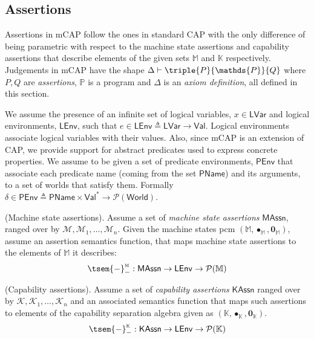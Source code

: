 \subsection{Assertions}

Assertions in mCAP follow the ones in standard CAP with the only difference of being parametric with respect to the machine state assertions and capability assertions that describe elements of the given sets $\mathbb{M}$ and $\mathbb{K}$ respectively. Judgements in mCAP have the shape $\Delta \vdash \triple{P}{\mathds{P}}{Q}$ where $P, Q$ are \textit{assertions}, $\mathds{P}$ is a program and $\Delta$ is an \textit{axiom definition}, all defined in this section.

We assume the presence of an infinite set of logical variables, $x \in \mathsf{LVar}$ and logical environments, $\mathsf{LEnv}$, such that $e \in \mathsf{LEnv} \triangleq \mathsf{LVar} \rightarrow \mathsf{Val}$. Logical environments associate logical variables with their values. Also, since mCAP is an extension of CAP, we provide support for abstract predicates used to express concrete properties. We assume to be given a set of predicate environments, $\mathsf{PEnv}$ that associate each predicate name (coming from the set $\mathsf{PName}$) and its arguments, to a set of worlds that satisfy them. Formally $\delta \in \mathsf{PEnv} \triangleq \mathsf{PName} \times \mathsf{Val}^* \rightarrow \mathcal{P}(\mathsf{World})$.

\begin{param}
	(Machine state assertions).
	Assume a set of \emph{machine state assertions} $\mathsf{MAssn}$, ranged over by $\mathcal{M}, \mathcal{M}_1, \ldots, \mathcal{M}_n$. Given the machine states pcm $(\mathbb{M}, \bullet_\mathbb{M}, \mathbf{0}_\mathbb{M})$, assume an assertion semantics function, that maps machine state assertions to the elements of $\mathbb{M}$ it describes:
	\[
		\tsem{-}_-^\textsc{m} : \mathsf{MAssn} \rightarrow \mathsf{LEnv} \rightarrow \mathcal{P}(\mathbb{M})
	\]
\end{param}

\begin{param}
	(Capability assertions).
	Assume a set of \emph{capability assertions} $\mathsf{KAssn}$ ranged over by $\mathcal{K}, \mathcal{K}_1, \ldots, \mathcal{K}_n$ and an associated semantics function that maps such assertions to elements of the capability separation algebra given as $(\mathbb{K}, \bullet_\mathbb{K}, \mathbf{0}_\mathbb{K})$.
	\[
		\tsem{-}_-^\textsc{k} : \mathsf{KAssn} \rightarrow \mathsf{LEnv} \rightarrow \mathcal{P}(\mathbb{K})
	\]
\end{param}


